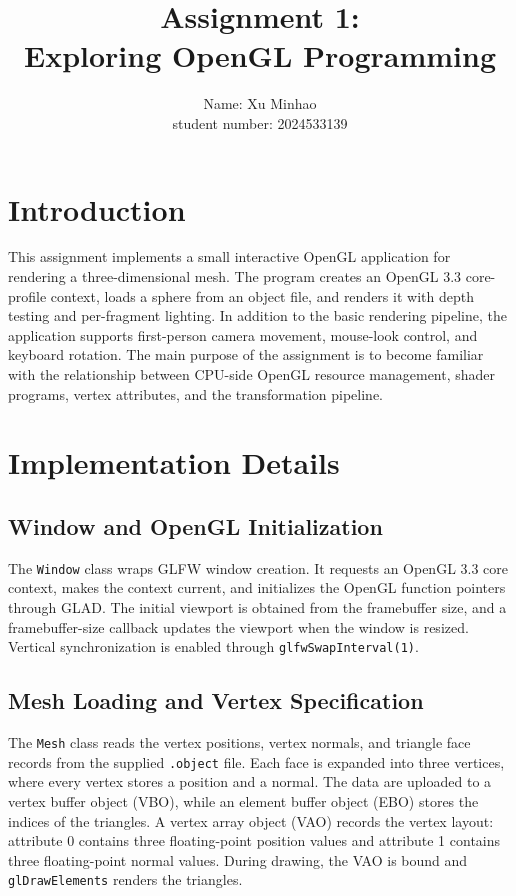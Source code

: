 \documentclass[acmtog]{acmart}
\title{Assignment 1:\\ {Exploring OpenGL Programming}}
\author{Name: Xu Minhao\\ student number: 2024533139}
\begin{document}
  \maketitle

  \vspace*{2 ex}

  \section{Introduction}
  This assignment implements a small interactive OpenGL application for rendering a
  three-dimensional mesh.  The program creates an OpenGL 3.3 core-profile
  context, loads a sphere from an object file, and renders it with depth testing
  and per-fragment lighting.  In addition to the basic rendering pipeline, the
  application supports first-person camera movement, mouse-look control, and
  keyboard rotation.  The main purpose of the assignment is to become familiar
  with the relationship between CPU-side OpenGL resource management, shader
  programs, vertex attributes, and the transformation pipeline.

  \section{Implementation Details}
  \subsection{Window and OpenGL Initialization}
  The \texttt{Window} class wraps GLFW window creation.  It requests an OpenGL
  3.3 core context, makes the context current, and initializes the OpenGL
  function pointers through GLAD.  The initial viewport is obtained from the
  framebuffer size, and a framebuffer-size callback updates the viewport when
  the window is resized.  Vertical synchronization is enabled through
  \texttt{glfwSwapInterval(1)}.

  \subsection{Mesh Loading and Vertex Specification}
  The \texttt{Mesh} class reads the vertex positions, vertex normals, and
  triangle face records from the supplied \texttt{.object} file.  Each face is
  expanded into three vertices, where every vertex stores a position and a
  normal.  The data are uploaded to a vertex buffer object (VBO), while an
  element buffer object (EBO) stores the indices of the triangles.  A vertex
  array object (VAO) records the vertex layout:
  attribute 0 contains three floating-point position values and attribute 1
  contains three floating-point normal values.  During drawing, the VAO is
  bound and \texttt{glDrawElements} renders the triangles.
\end{document}
